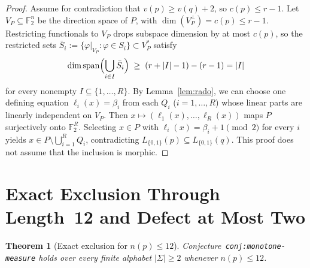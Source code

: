 \documentclass[11pt]{article}
\theoremstyle{plain}
\newtheorem{theorem}{Theorem}
\theoremstyle{definition}
\theoremstyle{remark}
\DeclareMathOperator{\spn}{span}
\begin{document}
\begin{proof}
Assume for contradiction that $v(p) \ge v(q) + 2$, so $c(p) \le r - 1$.
Let $V_P \subseteq \mathbb{F}_2^n$ be the direction space of $P$, with $\dim(V_P^\perp) = c(p) \le r - 1$.
Restricting functionals to $V_P$ drops subspace dimension by at most $c(p)$, so the restricted sets $\bar{S}_i := \{\varphi|_{V_P} : \varphi \in S_i\} \subset V_P^*$ satisfy
\[
\dim\spn\Bigl(\bigcup_{i \in I} \bar{S}_i\Bigr) \;\ge\; (r + |I| - 1) - (r - 1) = |I|
\]
for every nonempty $I \subseteq \{1, \dots, R\}$.
By Lemma~\ref{lem:rado}, we can choose one defining equation $\ell_i(x) = \beta_i$ from each $Q_i$ ($i = 1, \dots, R$) whose linear parts are linearly independent on $V_P$.
Then $x \mapsto (\ell_1(x), \dots, \ell_R(x))$ maps $P$ surjectively onto $\mathbb{F}_2^R$.
Selecting $x \in P$ with $\ell_i(x) = \beta_i + 1 \pmod 2$ for every $i$ yields $x \in P \setminus \bigcup_{i=1}^R Q_i$, contradicting $L_{\{0,1\}}(p) \subseteq L_{\{0,1\}}(q)$.
This proof does not assume that the inclusion is morphic.
\end{proof}

\section{Exact Exclusion Through Length~12 and Defect at Most Two}

\begin{theorem}[Exact exclusion for $n(p) \le 12$]\label{thm:n12}
Conjecture~\texttt{conj:monotone-measure} holds over every finite alphabet $|\Sigma| \ge 2$ whenever $n(p) \le 12$.
\end{theorem}
\end{document}
